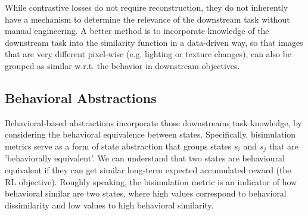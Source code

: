 


While contrastive losses do not require reconstruction, they do not inherently have a mechanism to determine the relevance of the downstream task without manual engineering. A better method is to incorporate knowledge of the downstream task into the similarity function in a data-driven way, so that images that are very different pixel-wise (e.g. lighting or texture changes), can also be grouped as similar w.r.t. the behavior in downstream objectives.


\subsection{Behavioral Abstractions}

Behavioral-based abstractions incorporate those downstreams task knowledge, by considering the behavioral equivalence between states. Specifically, bisimulation metrics serve as a form of state abstraction that groups states \(s_i\) and \(s_j\) that are 'behaviorally equivalent'. We can understand that two states are behavioural equivalent if they can get similar long-term expected accumulated reward (the RL objective). Roughly speaking, the bisimulation metric is an indicator of how behavioral similar are two states, where high values correspond to behavioral dissimilarity and low values to high behavioral similarity.  

